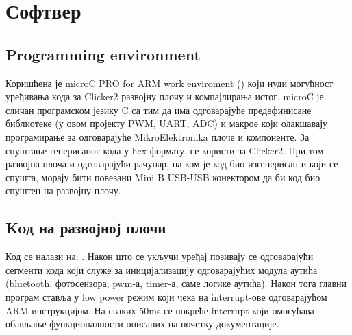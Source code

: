 \section{Софтвер}
\subsection{Programming environment}
Коришћена је microC PRO for ARM work enviroment (\cite{MICROCPRO}) који нуди могућност уређивања кода за Clicker2 развојну плочу и компајлирања истог. microC је сличан програмском језику C са тим да има одговарајуће предефинисане библиотеке (у овом пројекту PWM, UART, ADC) и макрое који олакшавају програмирање за одговарајуће MikroElektronika плоче и компоненте. За спуштање генерисаног кода у hex формату, се користи \cite{Bootloader} за Clicker2. При том развојна плоча и одговарајући рачунар, на ком је код био изгенерисан и који се спушта, морају бити повезани Mini B USB-USB конектором да би код био спуштен на развојну плочу.
\subsection{Koд на развојној плочи}
Код се налази на: \cite{Code}. Након што се укључи уређај позивају се одговарајући сегменти кода који служе за иницијализацију одговарајућих модула аутића (bluetooth, фотосензора, pwm-а, timer-а, саме логике аутића). Након тога главни програм ставља у low power режим који чека на interrupt-ове одговарајућом ARM инструкцијом. На сваких 50ms се покреће interrupt који омогућава обављање функционалности описаних на почетку документације. 

